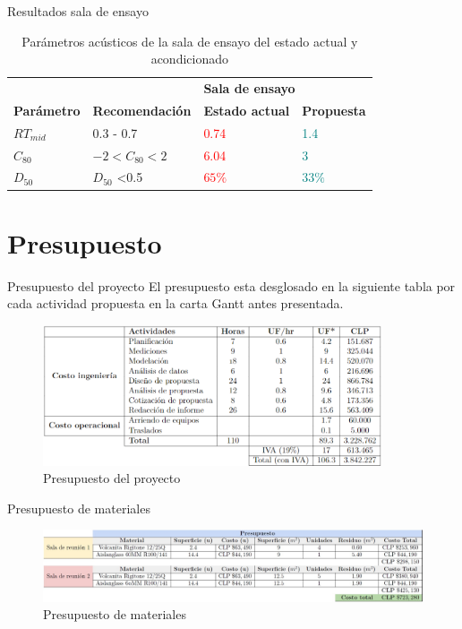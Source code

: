 \documentclass{sintefbeamer}
\begin{document}
\begin{frame}{Resultados sala de ensayo}
   
\begin{table}[H]
    \centering
    \caption{Parámetros acústicos de la sala de ensayo del estado actual y acondicionado}
    \label{tab: resultados sala de ensayo}
    \begin{tabular}{|l|l|ll|}
    \hline
     &  & \multicolumn{2}{l|}{\textbf{Sala de ensayo}} \\ \cline{3-4} 
    \multirow{-2}{*}{\textbf{Parámetro}} & \multirow{-2}{*}{\textbf{Recomendación}} & \multicolumn{1}{l|}{\textbf{Estado actual}} & \textbf{Propuesta} \\ \hline
    $RT_{mid}$ & 0.3 - 0.7 & \multicolumn{1}{l|}{\textcolor{red}{0.74}} & \textcolor{teal}{1.4} \\ \hline
    $C_{80}$ & $-2<C_{80}<2$ & \multicolumn{1}{l|}{\textcolor{red}{6.04}} & \textcolor{teal}{3} \\ \hline
    $D_{50}$ & $D_{50}$ \textless 0.5 & \multicolumn{1}{l|}{\textcolor{red}{$65\%$}} & \textcolor{teal}{$33\%$} \\ \hline
    \end{tabular}
\end{table}
\end{frame}


\section{Presupuesto}
\begin{frame}{Presupuesto del proyecto}
    El presupuesto esta desglosado en la siguiente tabla por cada actividad propuesta en la carta Gantt antes presentada.
\begin{figure}[H]
    \centering
    \includegraphics[width=10cm]{images/Presupuesto.png}
    \caption{Presupuesto del proyecto}
    \label{fig:presupuesto}
\end{figure}    
\end{frame}

\begin{frame}{Presupuesto de materiales}
    \begin{figure}
        \centering
        \includegraphics[width=14cm]{images/Presupuesto_material.jpg}
        \caption{Presupuesto de materiales}
    \end{figure}
\end{frame}
\end{document}
